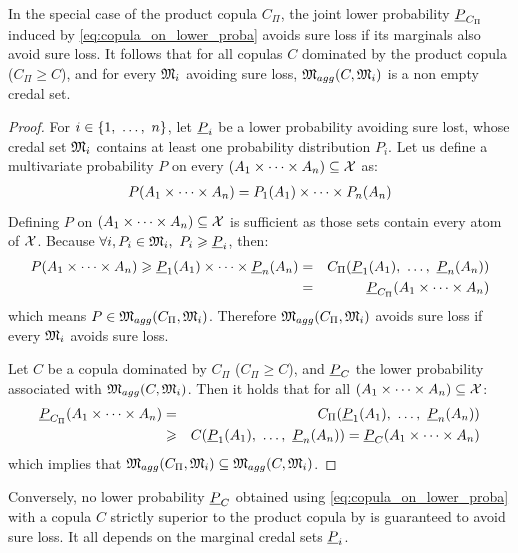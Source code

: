\begin{proposition}
    In the special case of the product copula $C_\Pi$, the joint lower probability $\underline{P}_{C_\Pi}$ induced by \eqref{eq:copula_on_lower_proba} avoids sure loss if its marginals also avoid sure loss. It follows that for all copulas $C$ dominated by the product copula (\ie $C_\Pi\geqslant C$), and for every $\mathfrak{M}_i$ avoiding sure loss, $\mathfrak{M}_{agg}(C, \mathfrak{M}_i)$ is a non empty credal set.
\end{proposition}

\begin{proof}
    For $i\in\{1 , ~\dots, ~ n\}$, let $\underline{P}_i$ be a lower probability avoiding sure lost, \ie whose credal set $\mathfrak{M}_i$ contains at least one probability distribution $P_i$. Let us define a multivariate probability $P$ on every $(A_1\times\dots\times A_n)\subseteq\mathcal{X}$ as:
    \begin{eqnarray*}
        P(A_1\times\dots\times A_n) = P_1(A_1)\times\dots\times P_n(A_n)
    \end{eqnarray*}
    Defining $P$ on $(A_1\times\dots\times A_n)\subseteq\mathcal{X}$ is sufficient as those sets contain every atom of $\mathcal{X}$.
    Because $\forall i, P_i\in\mathfrak{M}_i,~P_i\geqslant \underline{P}_i$, then:
    \begin{eqnarray*}
        P(A_1\times\dots\times A_n) \geqslant \underline{P}_1(A_1)\times\dots\times \underline{P}_n(A_n) &=& C_\Pi(\underline{P}_1(A_1) , ~\dots, ~ \underline{P}_n(A_n))\\
        &=& \underline{P}_{C_\Pi}(A_1\times\dots\times A_n)
    \end{eqnarray*}
which means $P\in\mathfrak{M}_{agg}(C_\Pi, \mathfrak{M}_i)$. Therefore $\mathfrak{M}_{agg}(C_\Pi, \mathfrak{M}_i)$ avoids sure loss if every $\mathfrak{M}_i$ avoids sure loss.

Let $C$ be a copula dominated by $C_\Pi$ (\ie $C_\Pi\geqslant C$), and $\underline{P}_C$ the lower probability associated with $\mathfrak{M}_{agg}(C, \mathfrak{M}_i)$. Then it holds that for all $(A_1\times\dots\times A_n)\subseteq\mathcal{X}$:
\begin{eqnarray*}
\underline{P}_{C_\Pi}(A_1\times\dots\times A_n)&=&C_\Pi(\underline{P}_1(A_1) , ~\dots, ~ \underline{P}_n(A_n)) \\
    &\geqslant& C(\underline{P}_1(A_1) , ~\dots, ~  \underline{P}_n(A_n)) = \underline{P}_C(A_1\times\dots\times A_n)
\end{eqnarray*}
which implies that $\mathfrak{M}_{agg}(C_\Pi, \mathfrak{M}_i)\subseteq \mathfrak{M}_{agg}(C, \mathfrak{M}_i)$.
\end{proof}

\begin{proposition}
    Conversely, no lower probability $\underline{P}_C$ obtained using \eqref{eq:copula_on_lower_proba} with a copula $C$ strictly superior to the product copula by is guaranteed to avoid sure loss. It all depends on the marginal credal sets $\underline{P}_i$.
\end{proposition}

